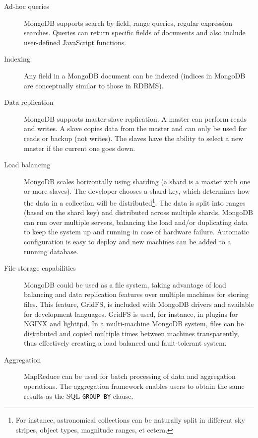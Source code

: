 \begin{description} %

\item[Ad-hoc queries] %
MongoDB supports search by field, range queries, regular expression searches. Queries can return specific fields of documents and also include user-defined JavaScript functions.

\item[Indexing] %
Any field in a MongoDB document can be indexed (indices in MongoDB are conceptually similar to those in RDBMS).

\item[Data replication] %
MongoDB supports master-slave replication. A master can perform reads and writes. A slave copies data from the master and can only be used for reads or backup (not writes). The slaves have the ability to select a new master if the current one goes down.

\item[Load balancing] %
MongoDB scales horizontally using sharding (a shard is a master with one or more slaves). The developer chooses a shard key, which determines how the data in a collection will be
distributed\footnote{For instance, astronomical collections can be naturally split in different sky stripes, object types, magnitude ranges, et cetera.}. %
The data is split into ranges (based on the shard key) and distributed across multiple shards. MongoDB can run over multiple servers, balancing the load and/or duplicating data to keep the system up and running in case of hardware failure. Automatic configuration is easy to deploy and new machines can be added to a running database.

\item[File storage capabilities] %

MongoDB could be used as a file system, taking advantage of load balancing and data replication features over multiple machines for storing files. This feature, GridFS, is included with MongoDB drivers and available for development languages. GridFS is used, for instance, in plugins for NGINX and lighttpd. In a multi-machine MongoDB system, files can be distributed and copied multiple times between machines transparently, thus effectively creating a load balanced and
fault-tolerant %
system.

\item[Aggregation] %
MapReduce can be used for batch processing of data and aggregation operations. The aggregation framework enables users to obtain the same results as the SQL
\texttt{GROUP BY}
clause.

\end{description} %

